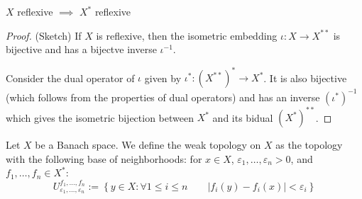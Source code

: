 \documentclass{article}
\begin{document}

\begin{unexaminable}
    \begin{proposition}
        $X$ reflexive $\implies$ $X^*$ reflexive
    \end{proposition}
    \begin{proof}(Sketch)
        If $X$ is reflexive, then the isometric embedding $\iota: X\to X^{**}$ is bijective and has a bijectve inverse $\iota^{-1}$.  

        Consider the dual operator of $\iota$ given by $\iota^*:(X^{**})^* \to X^*$. It is also bijective (which follows from the properties of dual operators) and has an inverse $(\iota^*)^{-1}$ which gives the isometric bijection between $X^*$ and its bidual $(X^*)^{**}$.  
    \end{proof}

    \begin{definition}
        Let $X$ be a Banach space. We define the weak topology on $X$ as the topology with the following base of neighborhoods: for $x\in X$, $\varepsilon_1, \ldots, \varepsilon_n > 0$, and $f_1, \ldots, f_n\in X^*$: 
        $$
        U_{\varepsilon_1, \ldots, \varepsilon_n}^{f_1, \ldots, f_n} := \left\{y\in X: \forall 1\leq i \leq n \qquad |f_i(y)-f_i(x)|<\varepsilon_i \right\}
        $$
    \end{definition}
\end{unexaminable}
\end{document}
